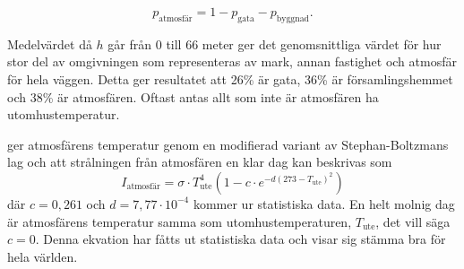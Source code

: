 \begin{equation}
p_\text{atmosfär}=1-p_\text{gata}-p_\text{byggnad}.
\end{equation}

Medelvärdet då $h$ går från 0 till 66 meter ger det genomsnittliga värdet för hur stor del av omgivningen som representeras av mark, annan fastighet och atmosfär för hela väggen. Detta ger resultatet att 26\% är gata, 36\% är 
 församlingshemmet och 38\% är atmosfären. Oftast antas allt som inte är atmosfären ha utomhustemperatur.

\cite{bb_atmosphere} ger atmosfärens temperatur genom en modifierad variant av Stephan-Boltzmans lag och att strålningen från atmosfären en klar dag kan beskrivas som 
\begin{equation}
I_\text{atmosfär}=\sigma\cdot T_\text{ute}^4(1-c \cdot e^{-d(273-T_\text{ute})^2})
\end{equation}
där $c=0,261$ och $d=7,77\cdot10^{-4}$ kommer ur statistiska data. En helt molnig dag är atmosfärens temperatur samma som utomhustemperaturen, $T_\text{ute}$, det vill säga $c=0$. Denna ekvation har fåtts ut statistiska data och visar sig stämma bra för hela världen\cite{bb_atmosphere}.